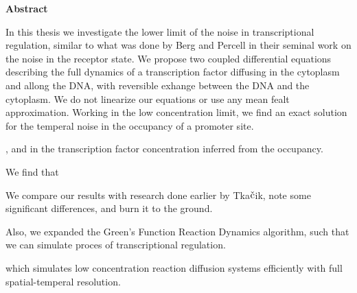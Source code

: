 \begin{center}
{\center \bf Abstract}
\end{center}

In this thesis we investigate the lower limit of the noise in transcriptional regulation, similar to what was done by Berg and Percell in their seminal work on the noise in the receptor state. We propose two coupled differential equations describing the full dynamics of a transcription factor diffusing in the cytoplasm and allong the DNA, with reversible exhange between the DNA and the cytoplasm. We do not linearize our equations or use any mean fealt approximation. Working in the low concentration limit, we find an exact solution for the temperal noise in the occupancy of a promoter site.

, and in the transcription factor concentration inferred from the occupancy. 

We find that 

We compare our results with research done earlier by Tka$\check{\rm c}$ik, note some significant differences, and burn it to the ground.

Also, we expanded the Green's Function Reaction Dynamics algorithm, such that we can simulate proces of transcriptional regulation.


which simulates low concentration reaction diffusion systems efficiently with full spatial-temperal resolution. 